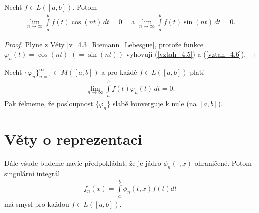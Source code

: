 \begin{theorem}\label{v_4.3_Riemann_Lebesgue}
Nechť $f \in L([a,b])$. Potom
\begin{align*}
\lim_{n \rightarrow \infty} \int \limits_a^b f(t) \cos(nt) \, dt = 0 \quad \textrm{ a } \lim_{n \rightarrow \infty} \int \limits_a^b f(t) \sin(nt) \, dt = 0.
\end{align*}
\begin{proof}
Plyne z Věty \ref{v_4.3_Riemann_Lebesgue}, protože funkce $\varphi_n(t) = \cos(nt)$ $(= \sin(nt))$ vyhovují (\eqref{vztah_4.5}) a (\eqref{vztah_4.6}).
\end{proof}
\end{theorem}

\begin{definition}
\label{d_4.4} 
Nechť $\{ \varphi_n \}_{n=1}^{\infty} \subset M([a,b])$ a pro každé $f \in L([a,b])$ platí 
\begin{align*}
\lim_{n \rightarrow \infty} \int \limits_a^b f(t) \varphi_n (t)\, dt = 0.
\end{align*}
 Pak řekneme, že posloupnost $\{ \varphi_n \}$ slabě konverguje k nule (na $[a,b]$).
\end{definition}




\section{Věty o reprezentaci}

Dále všude budeme navíc předpokládat, že je jádro $\phi_n (\cdot, x)$ ohraničené. Potom singulární integrál
\begin{align*}
f_n (x) = \int \limits_a^b \phi_n (t,x) f(t) dt
\end{align*}
má smysl pro každou $f \in L([a,b])$.




